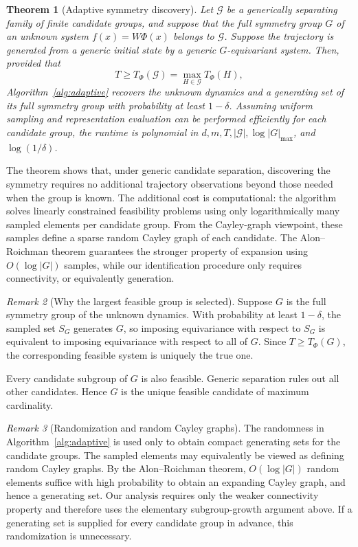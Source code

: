 \documentclass[11pt]{article}
\theoremstyle{plain}
\newtheorem{theorem}{Theorem}[section]
\theoremstyle{definition}
\theoremstyle{remark}
\newtheorem{remark}[theorem]{Remark}
\begin{document}
\begin{theorem}[Adaptive symmetry discovery]
\label{thm:adaptive}
Let \(\mathcal G\) be a generically separating family of finite candidate
groups, and suppose that the full symmetry group \(G\) of an unknown system
\(f(x)=W\Phi(x)\) belongs to \(\mathcal G\). Suppose the trajectory is
generated from a generic initial state by a generic \(G\)-equivariant system.
Then, provided that
\[
T\ge T_\Phi(\mathcal G)
=
\max_{H\in\mathcal G}T_\Phi(H),
\]
Algorithm~\ref{alg:adaptive} recovers the unknown dynamics and a generating
set of its full symmetry group with probability at least \(1-\delta\).
Assuming uniform sampling and representation evaluation can be performed
efficiently for each candidate group, the runtime is polynomial in
\(d,m,T,|\mathcal G|,\log|G|_{\max}\), and
\(\log(1/\delta)\).
\end{theorem}

The theorem shows that, under generic candidate separation, discovering the
symmetry requires no additional trajectory observations beyond those needed
when the group is known. The additional cost is computational: the algorithm
solves linearly constrained feasibility problems using only logarithmically
many sampled elements per candidate group. From the Cayley-graph viewpoint,
these samples define a sparse random Cayley graph of each candidate. The
Alon--Roichman theorem guarantees the stronger property of expansion using
\(O(\log|G|)\) samples, while our identification procedure only requires
connectivity, or equivalently generation.

\begin{remark}[Why the largest feasible group is selected]
Suppose \(G\) is the full symmetry group of the unknown dynamics. With
probability at least \(1-\delta\), the sampled set \(S_G\) generates \(G\), so
imposing equivariance with respect to \(S_G\) is equivalent to imposing
equivariance with respect to all of \(G\). Since \(T\ge T_\Phi(G)\), the
corresponding feasible system is uniquely the true one.

Every candidate subgroup of \(G\) is also feasible. Generic separation rules
out all other candidates. Hence \(G\) is the unique feasible candidate of
maximum cardinality.
\end{remark}

\begin{remark}[Randomization and random Cayley graphs]
The randomness in Algorithm~\ref{alg:adaptive} is used only to obtain compact
generating sets for the candidate groups. The sampled elements may
equivalently be viewed as defining random Cayley graphs. By the
Alon--Roichman theorem, \(O(\log|G|)\) random elements suffice with high
probability to obtain an expanding Cayley graph, and hence a generating set.
Our analysis requires only the weaker connectivity property and therefore uses
the elementary subgroup-growth argument above. If a generating set is supplied
for every candidate group in advance, this randomization is unnecessary.
\end{remark}
\end{document}
